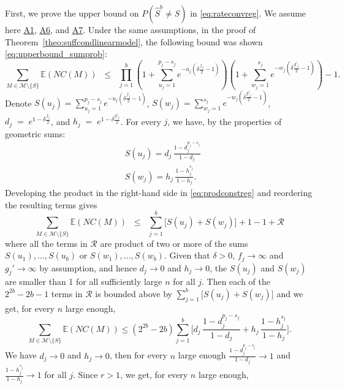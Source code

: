 \documentclass[bj,authoryear]{imsart}
\theoremstyle{plain}
\newcommand{\piotr}[1]{{\small{\color{red} \sf $\clubsuit$ Piotr: #1}}}
\newcommand{\E}{\mathbb{E}}
\newcommand{\M}{\mathcal{M}}
\begin{document}
First, we prove the upper bound on $P(\hat{S}^b \neq S)$ in \eqref{eq:rateconvreg}. We assume here \hyperlink{lab:A1}{A1}, \hyperlink{lab:A6}{A6}, and \hyperlink{lab:A7}{A7}. Under the same assumptions, in the proof of Theorem~\ref{theo:suffcondlinearmodel}, the following bound was shown \eqref{eq:upperbound_sumprob}:
\begin{equation}\label{eq:prodconstreg}
 \sum_{M \in \M\setminus \{S\}} \E\left(NC(M)\right)
    \;\;\leq\;\; \prod_{j=1}^b\left(1+\sum_{u_j=1}^{p_j-s_j}e^{-u_j\left(\delta \tfrac{f_j}{2}-1\right)}\right)\left(1+
    \sum_{w_j=1}^{s_j}    e^{-w_j\left(\delta \tfrac{g'_j}{2}-1\right)}\right) - 1.
\end{equation}
Denote $S(u_j)=\sum_{u_j=1}^{p_j-s_j}e^{-u_j\left(\delta \tfrac{f_j}{2}-1\right)}$,  $S(w_j)=\sum_{w_j=1}^{s_j}    e^{-w_j\left(\delta \tfrac{g'_j}{2}-1\right)}$, $d_j\;=\;e^{1-\delta \tfrac{f_j}{2}}$, and $h_j\;=\;e^{1-\delta \tfrac{g'_j}{2}}$. For every $j$, we have, by the properties of geometric sums:
\begin{align*}
    &S(u_j)
    =d_j\,\frac{1-d_j^{p_j-s_j}}{1-d_j} \\
    &S(w_j) =h_j\,\frac{1-h_j^{s_j}}{1-h_j}.
\end{align*}
Developing the product in the right-hand side in \eqref{eq:prodconstreg} and reordering the resulting terms gives
$$\sum_{M \in \M\setminus \{S\}} \E\left(NC(M)\right)\;\;\leq\;\;\sum_{j=1}^b\big[S(u_j)+S(w_j)\big]+1-1+\mathcal{R}$$
where all the terms in $\mathcal{R}$ are product of two or more of the sums $S(u_1),\ldots,S(u_b)$ or $S(w_1),\ldots,S(w_b)$. Given that $\delta>0$, $f_j \to \infty$ and $g_j' \to \infty$ by assumption, and hence $d_j \to 0$ and $h_j \to 0$, the $S(u_j)$ and $S(w_j)$ are smaller than 1 for all sufficiently large $n$ for all $j$. Then each of the $2^{2b}-2b-1$ terms in $\mathcal{R}$ is bounded above by $\sum_{j=1}^b\big[S(u_j)+S(w_j)\big]$ and we get, for every $n$ large enough,
 \begin{equation} \label{eq:fierg}
 \sum_{M \in \M\setminus \{S\}} \E\left(NC(M)\right)
 \leq (2^{2b}-2b)\sum_{j=1}^b \bigg[d_j\,\frac{1-d_j^{p_j-s_j}}{1-d_j}+ h_j\,\frac{1-h_j^{s_j}}{1-h_j}\bigg ]. \end{equation} 
 We have $d_j \to 0$ and $h_j \to 0$, then for every $n$ large enough $\frac{1-d_j^{p_j-s_j}}{1-d_j}\to1$ and $\frac{1-h_j^{s_j}}{1-h_j}\to1$ for all $j$. Since $r>1$, we get, for every $n$ large enough,
\end{document}
